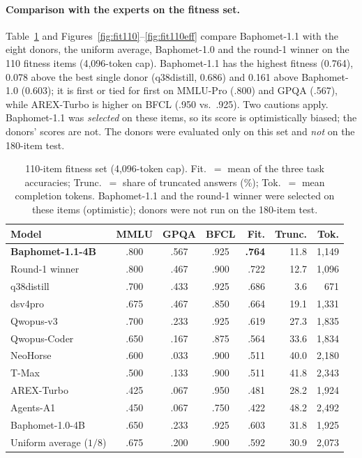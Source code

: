 \documentclass[10pt,a4paper]{article}
\begin{document}
\paragraph{Comparison with the experts on the fitness set.} Table~\ref{tab:fit110} and Figures~\ref{fig:fit110}--\ref{fig:fit110eff} compare Baphomet-1.1 with the eight donors, the uniform average, Baphomet-1.0 and the round-1 winner on the 110 fitness items (4{,}096-token cap). Baphomet-1.1 has the highest fitness (0.764), 0.078 above the best single donor (q38distill, 0.686) and 0.161 above Baphomet-1.0 (0.603); it is first or tied for first on MMLU-Pro (.800) and GPQA (.567), while AREX-Turbo is higher on BFCL (.950 vs.\ .925). Two cautions apply. Baphomet-1.1 was \emph{selected} on these items, so its score is optimistically biased; the donors' scores are not. The donors were evaluated only on this set and \emph{not} on the 180-item test.

\begin{table}[htbp]
\centering\small
\caption{110-item fitness set (4{,}096-token cap). Fit.\ $=$ mean of the three task accuracies; Trunc.\ $=$ share of truncated answers (\%); Tok.\ $=$ mean completion tokens. Baphomet-1.1 and the round-1 winner were selected on these items (optimistic); donors were not run on the 180-item test.}
\label{tab:fit110}
\setlength{\tabcolsep}{4pt}
\begin{tabular}{lcccrrr}
\toprule
Model & MMLU & GPQA & BFCL & Fit. & Trunc. & Tok. \\
\midrule
\textbf{Baphomet-1.1-4B} & .800 & .567 & .925 & \textbf{.764} & 11.8 & 1{,}149 \\
Round-1 winner & .800 & .467 & .900 & .722 & 12.7 & 1{,}096 \\
\midrule
q38distill & .700 & .433 & .925 & .686 & 3.6 & 671 \\
dsv4pro & .675 & .467 & .850 & .664 & 19.1 & 1{,}331 \\
Qwopus-v3 & .700 & .233 & .925 & .619 & 27.3 & 1{,}835 \\
Qwopus-Coder & .650 & .167 & .875 & .564 & 33.6 & 1{,}834 \\
NeoHorse & .600 & .033 & .900 & .511 & 40.0 & 2{,}180 \\
T-Max & .500 & .133 & .900 & .511 & 41.8 & 2{,}343 \\
AREX-Turbo & .425 & .067 & .950 & .481 & 28.2 & 1{,}924 \\
Agents-A1 & .450 & .067 & .750 & .422 & 48.2 & 2{,}492 \\
\midrule
Baphomet-1.0-4B & .650 & .233 & .925 & .603 & 31.8 & 1{,}925 \\
Uniform average ($1/8$) & .675 & .200 & .900 & .592 & 30.9 & 2{,}073 \\
\bottomrule
\end{tabular}
\end{table}
\end{document}
